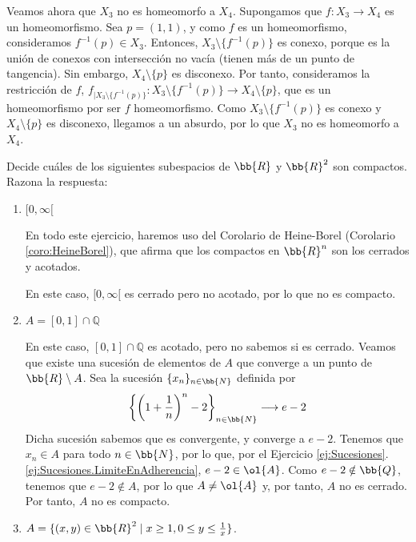 \begin{ejercicio}
    Veamos ahora que $X_3$ no es homeomorfo a $X_4$. Supongamos que $f:X_3\to X_4$ es un homeomorfismo.
    Sea $p=(1,1)$, y como $f$ es un homeomorfismo, consideramos $f^{-1}(p)\in X_3$. Entonces, $X_3\setminus \{f^{-1}(p)\}$ es conexo,
    porque es la unión de conexos con intersección no vacía (tienen más de un punto de tangencia). Sin embargo, $X_4\setminus \{p\}$ es disconexo.
    Por tanto, consideramos la restricción de $f$, ${f}_{\big| X_3\setminus \{f^{-1}(p)\}}: X_3\setminus \{f^{-1}(p)\} \to X_4\setminus \{p\}$, que es un homeomorfismo por ser $f$ homeomorfismo.
    Como $X_3\setminus \{f^{-1}(p)\}$ es conexo y $X_4\setminus \{p\}$ es disconexo, llegamos a un absurdo, por lo que $X_3$ no es homeomorfo a $X_4$.
\end{ejercicio}

\begin{ejercicio}
Decide cuáles de los siguientes subespacios de $ \bb{R} $ y $ \bb{R}^2 $ son compactos. Razona la respuesta:
\begin{enumerate}
    \item $[0, \infty[$
    
    En todo este ejercicio, haremos uso del Corolario de Heine-Borel (Corolario \ref{coro:HeineBorel}), que afirma que los 
    compactos en $\bb{R}^n$ son los cerrados y acotados.

    En este caso, $[0,\infty[$ es cerrado pero no acotado, por lo que no es compacto.

    \item $A=[0, 1] \cap \mathbb{Q}$
    
    En este caso, $[0,1]\cap \mathbb{Q}$ es acotado, pero no sabemos si es cerrado. Veamos que existe una sucesión
    de elementos de $A$ que converge a un punto de $\bb{R}\setminus A$. Sea la sucesión $\{x_n\}_{n\in \bb{N}}$ definida por
    \begin{equation*}
        \left\{ \left( 1 + \frac{1}{n} \right)^n -2 \right\}_{n\in \bb{N}} \longrightarrow e-2
    \end{equation*}
    Dicha sucesión sabemos que es convergente, y converge a $e-2$.
    Tenemos que $x_n\in A$ para todo $n\in \bb{N}$, por lo que, por el Ejercicio \ref{ej:Sucesiones}.\ref{ej:Sucesiones.LimiteEnAdherencia},
    $e-2\in \ol{A}$. Como $e-2\notin \bb{Q}$, tenemos que $e-2\notin A$, por lo que $A\neq \ol{A}$ y, por tanto,
    $A$ no es cerrado. Por tanto, $A$ no es compacto.

    \item $A=\{(x, y) \in \bb{R}^2 \mid x \geq 1, 0 \leq y \leq \frac{1}{x}\}$.
    

\end{enumerate}
\end{ejercicio}
